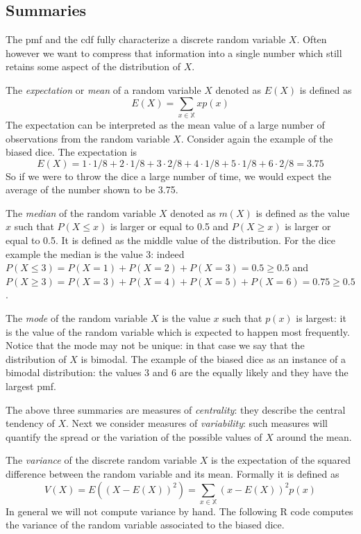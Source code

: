 \documentclass[
]{book}
\theoremstyle{definition}
\theoremstyle{definition}
\theoremstyle{definition}
\theoremstyle{definition}
\theoremstyle{remark}
\begin{document}
\hypertarget{summaries}{%
\subsection{Summaries}\label{summaries}}

The pmf and the cdf fully characterize a discrete random variable \(X\). Often however we want to compress that information into a single number which still retains some aspect of the distribution of \(X\).

The \emph{expectation} or \emph{mean} of a random variable \(X\) denoted as \(E(X)\) is defined as
\[
E(X)=\sum_{x\in\mathbb{X}}xp(x)
\]
The expectation can be interpreted as the mean value of a large number of observations from the random variable \(X\). Consider again the example of the biased dice. The expectation is
\[
E(X)=1\cdot1/8 + 2\cdot1/8 + 3\cdot 2/8 + 4\cdot 1/8 + 5\cdot 1/8 + 6\cdot 2/8 = 3.75
\]
So if we were to throw the dice a large number of time, we would expect the average of the number shown to be 3.75.

The \emph{median} of the random variable \(X\) denoted as \(m(X)\) is defined as the value \(x\) such that \(P(X\leq x)\) is larger or equal to 0.5 and \(P(X\geq x)\) is larger or equal to 0.5. It is defined as the middle value of the distribution. For the dice example the median is the value 3: indeed \(P(X\leq 3 ) = P(X=1)+P(X=2)+P(X=3)=0.5 \geq 0.5\) and \(P(X\geq 3) = P(X=3) + P(X=4) + P(X=5) + P(X=6) = 0.75 \geq 0.5\).

The \emph{mode} of the random variable \(X\) is the value \(x\) such that \(p(x)\) is largest: it is the value of the random variable which is expected to happen most frequently. Notice that the mode may not be unique: in that case we say that the distribution of \(X\) is bimodal. The example of the biased dice as an instance of a bimodal distribution: the values 3 and 6 are the equally likely and they have the largest pmf.

The above three summaries are measures of \emph{centrality}: they describe the central tendency of \(X\). Next we consider measures of \emph{variability}: such measures will quantify the spread or the variation of the possible values of \(X\) around the mean.

The \emph{variance} of the discrete random variable \(X\) is the expectation of the squared difference between the random variable and its mean. Formally it is defined as
\[
V(X)=E((X-E(X))^2)=\sum_{x\in\mathbb{X}}(x-E(X))^2p(x)
\]
In general we will not compute variance by hand. The following R code computes the variance of the random variable associated to the biased dice.
\end{document}
